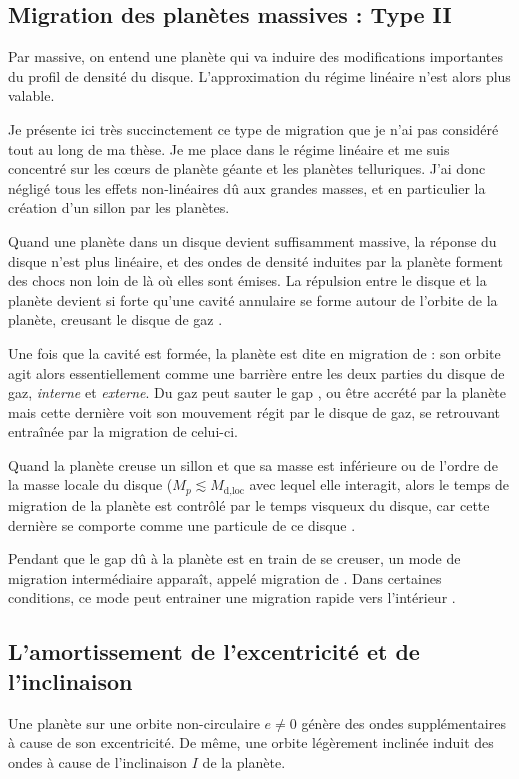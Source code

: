 \subsection{Migration des planètes massives : Type II}
Par massive, on entend une planète qui va induire des modifications importantes du profil de densité du disque. L'approximation du régime linéaire n'est alors plus valable. 

Je présente ici très succinctement ce type de migration que je n'ai pas considéré tout au long de ma thèse. Je me place dans le régime linéaire et me suis concentré sur les cœurs de planète géante et les planètes telluriques. J'ai donc négligé tous les effets non-linéaires dû aux grandes masses, et en particulier la création d'un sillon par les planètes.

\bigskip

Quand une planète dans un disque devient suffisamment massive, la réponse du disque n'est plus linéaire, et des ondes de densité induites par la planète forment des chocs non loin de là où elles sont émises. La répulsion entre le disque et la planète devient si forte qu'une cavité annulaire se forme autour de l'orbite de la planète, creusant le disque de gaz \citep{lin1986tidal}.

Une fois que la cavité est formée, la planète est dite en migration de  : son orbite agit alors essentiellement comme une barrière entre les deux parties du disque de gaz, \emph{interne} et \emph{externe}. Du gaz peut sauter le gap \citep{lubow2006gas}, ou être accrété par la planète mais cette dernière voit son mouvement régit par le disque de gaz, se retrouvant entraînée par la migration de celui-ci.

Quand la planète creuse un sillon et que sa masse est inférieure ou de l'ordre de la masse locale du disque ($M_p \lesssim M_\text{d,loc}$ avec lequel elle interagit, alors le temps de migration de la planète est contrôlé par le temps visqueux du disque, car cette dernière se comporte comme une particule de ce disque \citep{nelson2000migration}.

\bigskip

Pendant que le gap dû à la planète est en train de se creuser, un mode de migration intermédiaire apparaît, appelé migration de 
. Dans certaines conditions, ce mode peut entrainer une migration rapide vers l'intérieur 
\citep{masset2003runaway}. 

\subsection{L'amortissement de l'excentricité et de l'inclinaison}%
Une planète sur une orbite non-circulaire $e\neq 0$ génère des ondes supplémentaires à cause de son excentricité. De même, une orbite légèrement inclinée induit des ondes à cause de l'inclinaison $I$ de la planète. 

